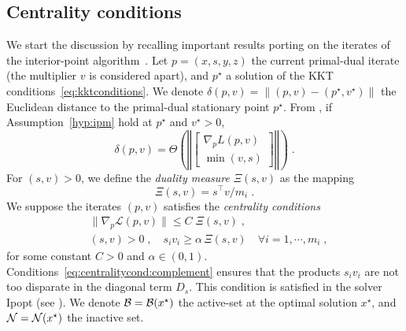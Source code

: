 \subsection{Centrality conditions}
We start the discussion by recalling important results porting
on the iterates of the interior-point algorithm~\cite{wright2001effects}.
Let $p = (x, s, y, z)$ the current primal-dual iterate (the multiplier $v$ is considered apart),
and $p^\star$ a solution of the KKT conditions~\eqref{eq:kktconditions}.
We denote $\delta(p, v) = \| (p, v) - (p^\star, v^\star) \|$ the Euclidean distance to the
primal-dual stationary point $p^\star$.
From \cite[Theorem 2.2]{wright2001effects}, if Assumption~\ref{hyp:ipm}
hold at $p^\star$ and $v^\star > 0$,
\begin{equation}
  \delta(p, v) = \Theta\left( \left\Vert \begin{bmatrix}
      \nabla_p L(p, v) \\ \min(v, s)
  \end{bmatrix}
  \right\Vert \right) \; .
\end{equation}
For $(s, v) > 0$, we define the \emph{duality measure} $\Xi(s, v)$ as the mapping
\begin{equation}
  \Xi(s, v) = s^\top v / m_i \; .
\end{equation}
We suppose the iterates $(p, v)$ satisfies the \emph{centrality conditions}
\begin{subequations}
  \label{eq:centralitycond}
  \begin{align}
    & \| \nabla_p \mathcal{L}(p, v) \| \leq C \; \Xi(s, v) \;,  \\
    \label{eq:centralitycond:complement}
    & (s, v) > 0 \;,\quad s_i v_i \geq \alpha \, \Xi(s, v) \quad \forall i =1, \cdots, m_i \; ,
  \end{align}
\end{subequations}
for some constant $C > 0$ and $\alpha \in (0, 1)$.
Conditions~\eqref{eq:centralitycond:complement} ensures that the products
$s_i v_i$ are not too disparate in the diagonal term $D_s$.
This condition is satisfied in the solver Ipopt (see \cite[Equation (16)]{wachter2006implementation}).
We denote $\mathcal{B} = \mathcal{B}(x^\star)$ the active-set at the optimal solution $x^\star$,
and $\mathcal{N} = \mathcal{N}(x^\star)$ the inactive set.

